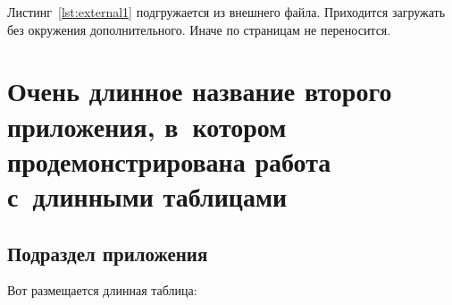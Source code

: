 Листинг~\cref{lst:external1} подгружается из внешнего файла. Приходится
загружать без окружения дополнительного. Иначе по страницам не переносится.
\begingroup
\captiondelim{ } %

\endgroup

\chapter{Очень длинное название второго приложения, в~котором продемонстрирована работа с~длинными таблицами}\label{app:B}

\section{Подраздел приложения}\label{app:B1}
Вот размещается длинная таблица:
\makeatletter
{} %
{}
{
    {\addtocounter{table}{-1}}
    {}
}
\makeatother
\fontsize{10pt}{10pt}\selectfont
